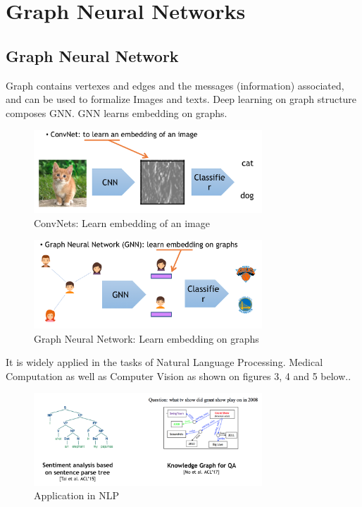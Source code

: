 \chapter{Graph Neural Networks}

\section{Graph Neural Network}
Graph contains vertexes and edges and the messages (information) associated, and can be used to formalize Images and texts. Deep learning on graph structure composes GNN. GNN learns embedding on graphs. 

\begin{figure}[ht]
\begin{center}
  \includegraphics[width=3.38in]{figs/Embedding_ConvNet.png}
\end{center}
   \caption{ConvNets: Learn embedding of an image}
\label{fig:CV}
\end{figure}

\begin{figure}[ht]
\begin{center}
  \includegraphics[width=3.38in]{figs/Embedding_Graph.png}
\end{center}
   \caption{Graph Neural Network: Learn embedding on graphs}
\label{fig:CV}
\end{figure}

It is widely applied in the tasks of Natural Language Processing. Medical Computation as well as Computer Vision as shown on figures 3, 4 and 5 below.. 
\begin{figure}[ht]
\begin{center}
  \includegraphics[width=3.38in]{figs/NLP.png}
\end{center}
   \caption{Application in NLP}
\label{fig:CV}
\end{figure}

